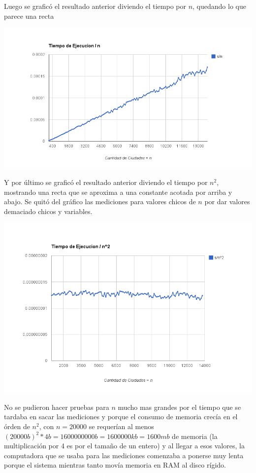 Luego se grafic\'o el resultado anterior diviendo el tiempo por $n$, quedando lo que parece una recta
\begin{center}
	\includegraphics[scale=0.6]{images/ej2_d_n.png}
\end{center}

Y por \'ultimo se grafic\'o el resultado anterior diviendo el tiempo por $n^2$, mostrando una recta que se aproxima a una constante acotada por arriba y abajo. Se quit\'o del gr\'afico las mediciones para valores chicos de $n$ por dar valores demaciado chicos y variables.
\begin{center}
	\includegraphics[scale=0.6]{images/ej2_d_n2.png}
\end{center}

No se pudieron hacer pruebas para $n$ mucho mas grandes por el tiempo que se tardaba en sacar las mediciones y porque el consumo de memoria crec\'ia en el \'orden de $n^2$, con $n = 20000$ se requer\'ian al menos $(20000b)^2 * 4b = 1600000000b = 1600000kb = 1600mb$ de memoria (la multiplicaci\'on por 4 es por el tama\~no de un entero) y al llegar a esos valores, la computadora que se usaba para las mediciones comenzaba a ponerse muy lenta porque el sistema mientras tanto mov\'ia memoria en RAM al disco r\'igido.


